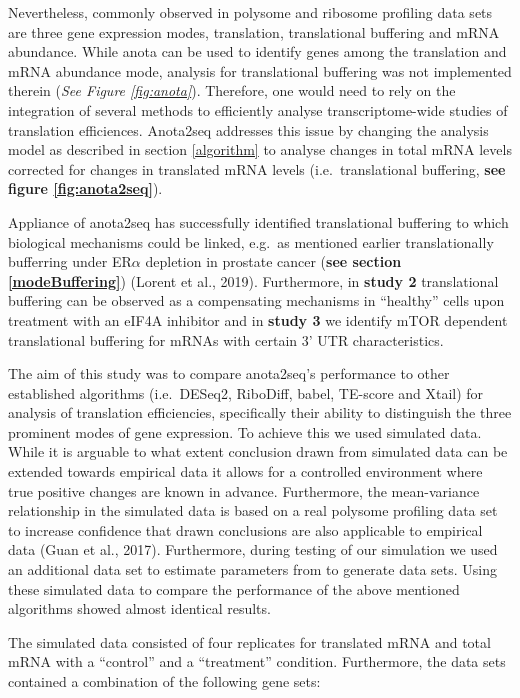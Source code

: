 \documentclass[12pt,openany]{book}
\begin{document}
Nevertheless, commonly observed in polysome and ribosome profiling data
sets are three gene expression modes, translation, translational
buffering and mRNA abundance. While anota can be used to identify genes
among the translation and mRNA abundance mode, analysis for
translational buffering was not implemented therein (\emph{See Figure
\ref{fig:anota}}). Therefore, one would need to rely on the integration
of several methods to efficiently analyse transcriptome-wide studies of
translation efficiences. Anota2seq addresses this issue by changing the
analysis model as described in section \ref{algorithm} to analyse
changes in total mRNA levels corrected for changes in translated mRNA
levels (i.e.~translational buffering, \textbf{see figure
\ref{fig:anota2seq}}).

Appliance of anota2seq has successfully identified translational
buffering to which biological mechanisms could be linked, e.g.~as
mentioned earlier translationally bufferring under ER\(\alpha\)
depletion in prostate cancer (\textbf{see section \ref{modeBuffering}})
(Lorent et al., 2019). Furthermore, in \textbf{study 2} translational
buffering can be observed as a compensating mechanisms in ``healthy''
cells upon treatment with an eIF4A inhibitor and in \textbf{study 3} we
identify mTOR dependent translational buffering for mRNAs with certain
3' UTR characteristics.

The aim of this study was to compare anota2seq's performance to other
established algorithms (i.e.~DESeq2, RiboDiff, babel, TE-score and
Xtail) for analysis of translation efficiencies, specifically their
ability to distinguish the three prominent modes of gene expression. To
achieve this we used simulated data. While it is arguable to what extent
conclusion drawn from simulated data can be extended towards empirical
data it allows for a controlled environment where true positive changes
are known in advance. Furthermore, the mean-variance relationship in the
simulated data is based on a real polysome profiling data set to
increase confidence that drawn conclusions are also applicable to
empirical data (Guan et al., 2017). Furthermore, during testing of our
simulation we used an additional data set to estimate parameters from to
generate data sets. Using these simulated data to compare the
performance of the above mentioned algorithms showed almost identical
results.

The simulated data consisted of four replicates for translated mRNA and
total mRNA with a ``control'' and a ``treatment'' condition.
Furthermore, the data sets contained a combination of the following gene
sets:
\end{document}
